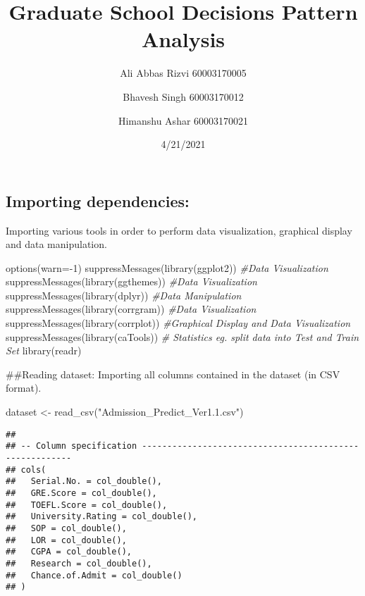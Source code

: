\documentclass[
]{article}
\title{Graduate School Decisions Pattern Analysis}
\author{Ali Abbas Rizvi 60003170005 \and Bhavesh Singh
60003170012 \and Himanshu Ashar 60003170021}
\date{4/21/2021}
\newenvironment{Shaded}{\begin{snugshade}}{\end{snugshade}}
\newcommand{\AttributeTok}[1]{\textcolor[rgb]{0.77,0.63,0.00}{#1}}
\newcommand{\CommentTok}[1]{\textcolor[rgb]{0.56,0.35,0.01}{\textit{#1}}}
\newcommand{\DecValTok}[1]{\textcolor[rgb]{0.00,0.00,0.81}{#1}}
\newcommand{\FunctionTok}[1]{\textcolor[rgb]{0.00,0.00,0.00}{#1}}
\newcommand{\NormalTok}[1]{#1}
\newcommand{\OtherTok}[1]{\textcolor[rgb]{0.56,0.35,0.01}{#1}}
\newcommand{\SpecialCharTok}[1]{\textcolor[rgb]{0.00,0.00,0.00}{#1}}
\newcommand{\StringTok}[1]{\textcolor[rgb]{0.31,0.60,0.02}{#1}}
\begin{document}
\maketitle

\hypertarget{importing-dependencies}{%
\subsection{Importing dependencies:}\label{importing-dependencies}}

Importing various tools in order to perform data visualization,
graphical display and data manipulation.

\begin{Shaded}
\begin{Highlighting}[]
\FunctionTok{options}\NormalTok{(}\AttributeTok{warn=}\SpecialCharTok{{-}}\DecValTok{1}\NormalTok{)}
\FunctionTok{suppressMessages}\NormalTok{(}\FunctionTok{library}\NormalTok{(ggplot2)) }\CommentTok{\#Data Visualization}
\FunctionTok{suppressMessages}\NormalTok{(}\FunctionTok{library}\NormalTok{(ggthemes)) }\CommentTok{\#Data Visualization}
\FunctionTok{suppressMessages}\NormalTok{(}\FunctionTok{library}\NormalTok{(dplyr)) }\CommentTok{\#Data Manipulation}
\FunctionTok{suppressMessages}\NormalTok{(}\FunctionTok{library}\NormalTok{(corrgram)) }\CommentTok{\#Data Visualization}
\FunctionTok{suppressMessages}\NormalTok{(}\FunctionTok{library}\NormalTok{(corrplot)) }\CommentTok{\#Graphical Display and Data Visualization}
\FunctionTok{suppressMessages}\NormalTok{(}\FunctionTok{library}\NormalTok{(caTools)) }\CommentTok{\# Statistics eg. split data into Test and Train Set}
\FunctionTok{library}\NormalTok{(readr)}
\end{Highlighting}
\end{Shaded}

\#\#Reading dataset: Importing all columns contained in the dataset (in
CSV format).

\begin{Shaded}
\begin{Highlighting}[]
\NormalTok{dataset }\OtherTok{\textless{}{-}} \FunctionTok{read\_csv}\NormalTok{(}\StringTok{"Admission\_Predict\_Ver1.1.csv"}\NormalTok{)}
\end{Highlighting}
\end{Shaded}

\begin{verbatim}
## 
## -- Column specification --------------------------------------------------------
## cols(
##   Serial.No. = col_double(),
##   GRE.Score = col_double(),
##   TOEFL.Score = col_double(),
##   University.Rating = col_double(),
##   SOP = col_double(),
##   LOR = col_double(),
##   CGPA = col_double(),
##   Research = col_double(),
##   Chance.of.Admit = col_double()
## )
\end{verbatim}
\end{document}
